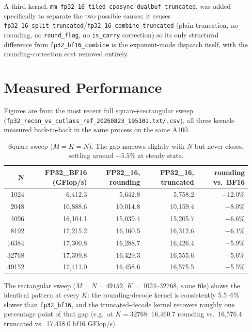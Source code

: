 \documentclass[11pt]{article}
\begin{document}
A third kernel, \texttt{mm\_fp32\_16\_tiled\_cpasync\_dualbuf\_truncated}, was added specifically to separate the two possible causes: it reuses \texttt{fp32\_16\_split\_truncated}/\texttt{fp32\_16\_combine\_truncated} (plain truncation, no rounding, no \texttt{round\_flag}, no \texttt{is\_carry} correction) so its only structural difference from \texttt{fp32\_bf16\_combine} is the exponent-mode dispatch itself, with the rounding-correction cost removed entirely.

\section{Measured Performance}

Figures are from the most recent full square+rectangular sweep (\texttt{fp32\_recon\_vs\_cutlass\_ref\_20260823\_195101.txt/.csv}), all three kernels measured back-to-back in the same process on the same A100.

\begin{table}[h]
\centering
\begin{tabular}{rrrrr}
\toprule
N & FP32\_BF16 (GFlop/s) & FP32\_16, rounding & FP32\_16, truncated & rounding vs.\ BF16 \\
\midrule
1024   & 6{,}412.3  & 5{,}642.8  & 5{,}758.2  & $-$12.0\% \\
2048   & 10{,}888.6 & 10{,}014.8 & 10{,}159.4 & $-$8.0\% \\
4096   & 16{,}104.1 & 15{,}039.4 & 15{,}205.7 & $-$6.6\% \\
8192   & 17{,}215.2 & 16{,}160.5 & 16{,}312.6 & $-$6.1\% \\
16384  & 17{,}300.8 & 16{,}288.7 & 16{,}426.4 & $-$5.9\% \\
32768  & 17{,}399.8 & 16{,}429.3 & 16{,}555.6 & $-$5.6\% \\
49152  & 17{,}411.0 & 16{,}458.6 & 16{,}575.5 & $-$5.5\% \\
\bottomrule
\end{tabular}
\caption{Square sweep ($M=K=N$). The gap narrows slightly with $N$ but never closes, settling around $-5.5$\% at steady state.}
\end{table}

The rectangular sweep ($M=N=49152$, $K$ = 1024--32768, same file) shows the identical pattern at every $K$: the rounding-decode kernel is consistently 5.5--6\% slower than \texttt{fp32\_bf16}, and the truncated-decode kernel recovers roughly one percentage point of that gap (e.g.\ at $K=32768$: 16{,}460.7 rounding vs.\ 16{,}576.4 truncated vs.\ 17{,}418.0 bf16 GFlop/s).
\end{document}
